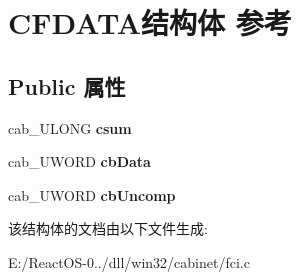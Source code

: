 \hypertarget{struct_c_f_d_a_t_a}{}\section{C\+F\+D\+A\+T\+A结构体 参考}
\label{struct_c_f_d_a_t_a}
\subsection*{Public 属性}
\begin{DoxyCompactItemize}
\item 
\mbox{\label{struct_c_f_d_a_t_a_a28b190a1511c2608ea4eedb70d6f543b}} 
cab\+\_\+\+U\+L\+O\+NG {\bfseries csum}
\item 
\mbox{\label{struct_c_f_d_a_t_a_ac1a4ca3421e53f2fc98fb24953caf042}} 
cab\+\_\+\+U\+W\+O\+RD {\bfseries cb\+Data}
\item 
\mbox{\label{struct_c_f_d_a_t_a_a5d6eb719862c699abde1fc68d7285bd3}} 
cab\+\_\+\+U\+W\+O\+RD {\bfseries cb\+Uncomp}
\end{DoxyCompactItemize}


该结构体的文档由以下文件生成\+:\begin{DoxyCompactItemize}
\item 
E\+:/\+React\+O\+S-\/0../dll/win32/cabinet/fci.\+c\end{DoxyCompactItemize}
